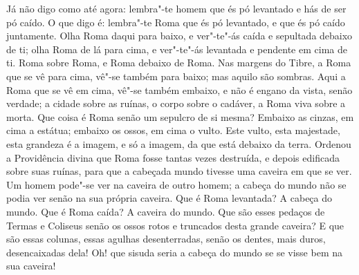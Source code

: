 Já não digo como até agora: lembra"-te homem que és pó levantado e hás de
ser pó caído. O que digo é: lembra"-te Roma que és pó levantado, e que és
pó caído juntamente. Olha Roma daqui para baixo, e ver"-te"-ás caída e
sepultada debaixo de ti; olha Roma de lá para cima, e ver"-te"-ás
levantada e pendente em cima de ti. Roma sobre Roma, e Roma debaixo de
Roma. Nas margens do Tibre, a Roma que se vê para cima, vê"-se também
para baixo; mas aquilo são sombras. Aqui a Roma que se vê em cima, vê"-se
também embaixo, e não é engano da vista, senão verdade; a cidade sobre as
ruínas, o corpo sobre o cadáver, a Roma viva sobre a morta. Que coisa é
Roma senão um sepulcro de si mesma? Embaixo as cinzas, em cima a
estátua; embaixo os ossos, em cima o vulto. Este vulto, esta majestade,
esta grandeza é a imagem, e só a imagem, da que está debaixo da terra.
Ordenou a Providência divina que Roma fosse tantas vezes destruída, e
depois edificada sobre suas ruínas, para que a cabeçada mundo tivesse
uma caveira em que se ver. Um homem pode"-se ver na caveira de outro
homem; a cabeça do mundo não se podia ver senão na sua própria caveira.
Que é Roma levantada? A cabeça do mundo. Que é Roma caída? A caveira do
mundo. Que são esses pedaços de Termas e Coliseus senão os ossos rotos e
truncados desta grande caveira? E que são essas colunas, essas agulhas
desenterradas, senão os dentes, mais duros, desencaixadas dela! Oh! que
sisuda seria a cabeça do mundo se se visse bem na sua caveira!

